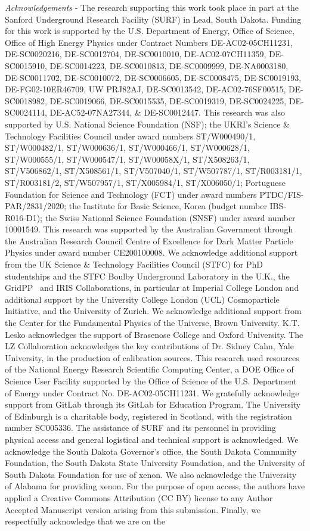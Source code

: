 \emph{Acknowledgements} - The research supporting this work took place in part at the Sanford Underground Research Facility (SURF) in Lead, South Dakota. Funding for this work is supported by the U.S. Department of Energy, Office of Science, Office of High Energy Physics under Contract Numbers DE-AC02-05CH11231, DE-SC0020216, DE-SC0012704, DE-SC0010010, DE-AC02-07CH11359, DE-SC0015910, DE-SC0014223, DE-SC0010813, DE-SC0009999, DE-NA0003180, DE-SC0011702, DE-SC0010072, DE-SC0006605, DE-SC0008475, DE-SC0019193, DE-FG02-10ER46709, UW PRJ82AJ, DE-SC0013542, DE-AC02-76SF00515, DE-SC0018982, DE-SC0019066, DE-SC0015535, DE-SC0019319, DE-SC0024225, DE-SC0024114, DE-AC52-07NA27344, \& DE-SC0012447. This research was also supported by U.S. National Science Foundation (NSF); the UKRI’s Science \& Technology Facilities Council under award numbers ST/W000490/1, ST/W000482/1, ST/W000636/1, ST/W000466/1, ST/W000628/1, ST/W000555/1, ST/W000547/1, ST/W00058X/1, ST/X508263/1, ST/V506862/1, ST/X508561/1, ST/V507040/1, ST/W507787/1, ST/R003181/1, ST/R003181/2,  ST/W507957/1, ST/X005984/1, ST/X006050/1; Portuguese Foundation for Science and Technology (FCT) under award numbers PTDC/FIS-PAR/2831/2020; the Institute for Basic Science, Korea (budget number IBS-R016-D1); the Swiss National Science Foundation (SNSF)  under award number 10001549. This research was supported by the Australian Government through the Australian Research Council Centre of Excellence for Dark Matter Particle Physics under award number CE200100008. We acknowledge additional support from the UK Science \& Technology Facilities Council (STFC) for PhD studentships and the STFC Boulby Underground Laboratory in the U.K., the GridPP~\cite{faulkner2005gridpp,britton2009gridpp} and IRIS Collaborations, in particular at Imperial College London and additional support by the University College London (UCL) Cosmoparticle Initiative, and the University of Zurich. We acknowledge additional support from the Center for the Fundamental Physics of the Universe, Brown University. K.T. Lesko acknowledges the support of Brasenose College and Oxford University. The LZ Collaboration acknowledges the key contributions of Dr. Sidney Cahn, Yale University, in the production of calibration sources. This research used resources of the National Energy Research Scientific Computing Center, a DOE Office of Science User Facility supported by the Office of Science of the U.S. Department of Energy under Contract No. DE-AC02-05CH11231. We gratefully acknowledge support from GitLab through its GitLab for Education Program. The University of Edinburgh is a charitable body, registered in Scotland, with the registration number SC005336. The assistance of SURF and its personnel in providing physical access and general logistical and technical support is acknowledged. We acknowledge the South Dakota Governor's office, the South Dakota Community Foundation, the South Dakota State University Foundation, and the University of South Dakota Foundation for use of xenon. We also acknowledge the University of Alabama for providing xenon. For the purpose of open access, the authors have applied a Creative Commons Attribution (CC BY) license to any Author Accepted Manuscript version arising from this submission. Finally, we respectfully acknowledge that we are on the 
